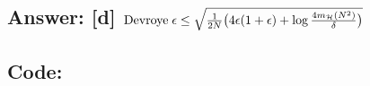 \documentclass[11pt]{article}
\begin{document}
\hypertarget{answer-d-rm-devroye-epsilon-le-sqrtfrac12nbig4epsilon1epsilonlogfrac4-m_mathcalhn2deltabig}{%
\subsection{\texorpdfstring{Answer: {[}d{]}
\({\rm Devroye}\; \epsilon \le \sqrt{\frac{1}{2N}\big(4\epsilon(1+\epsilon)+\log{\frac{4 m_{\mathcal{H}}(N^2)}{\delta}}\big)}\)}{Answer: {[}d{]} \{\textbackslash{}rm Devroye\}\textbackslash{}; \textbackslash{}epsilon \textbackslash{}le \textbackslash{}sqrt\{\textbackslash{}frac\{1\}\{2N\}\textbackslash{}big(4\textbackslash{}epsilon(1+\textbackslash{}epsilon)+\textbackslash{}log\{\textbackslash{}frac\{4 m\_\{\textbackslash{}mathcal\{H\}\}(N\^{}2)\}\{\textbackslash{}delta\}\}\textbackslash{}big)\}}}\label{answer-d-rm-devroye-epsilon-le-sqrtfrac12nbig4epsilon1epsilonlogfrac4-m_mathcalhn2deltabig}}

\hypertarget{code}{%
\subsection{Code:}\label{code}}
\end{document}
